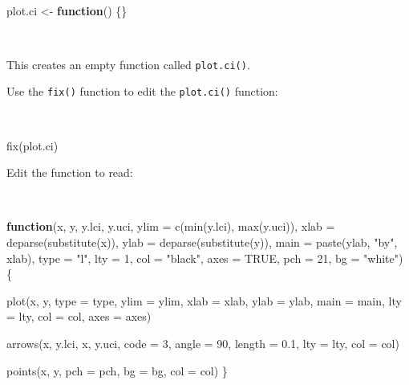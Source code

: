 \documentclass[
  12pt,
  a4paper]{book}
\newenvironment{Shaded}{\begin{snugshade}}{\end{snugshade}}
\newcommand{\AttributeTok}[1]{\textcolor[rgb]{0.77,0.63,0.00}{#1}}
\newcommand{\ConstantTok}[1]{\textcolor[rgb]{0.00,0.00,0.00}{#1}}
\newcommand{\ControlFlowTok}[1]{\textcolor[rgb]{0.13,0.29,0.53}{\textbf{#1}}}
\newcommand{\DecValTok}[1]{\textcolor[rgb]{0.00,0.00,0.81}{#1}}
\newcommand{\FloatTok}[1]{\textcolor[rgb]{0.00,0.00,0.81}{#1}}
\newcommand{\FunctionTok}[1]{\textcolor[rgb]{0.00,0.00,0.00}{#1}}
\newcommand{\NormalTok}[1]{#1}
\newcommand{\OtherTok}[1]{\textcolor[rgb]{0.56,0.35,0.01}{#1}}
\newcommand{\StringTok}[1]{\textcolor[rgb]{0.31,0.60,0.02}{#1}}
\begin{document}
~

\begin{Shaded}
\begin{Highlighting}[]
\NormalTok{plot.ci }\OtherTok{\textless{}{-}} \ControlFlowTok{function}\NormalTok{() \{\}}
\end{Highlighting}
\end{Shaded}

~

This creates an empty function called \texttt{plot.ci()}.

Use the \texttt{fix()} function to edit the \texttt{plot.ci()} function:

~

\begin{Shaded}
\begin{Highlighting}[]
\FunctionTok{fix}\NormalTok{(plot.ci)}
\end{Highlighting}
\end{Shaded}

\newpage

Edit the function to read:

~

\begin{Shaded}
\begin{Highlighting}[]
\ControlFlowTok{function}\NormalTok{(x,}
\NormalTok{         y, y.lci, y.uci,}
         \AttributeTok{ylim =} \FunctionTok{c}\NormalTok{(}\FunctionTok{min}\NormalTok{(y.lci), }\FunctionTok{max}\NormalTok{(y.uci)),}
         \AttributeTok{xlab =} \FunctionTok{deparse}\NormalTok{(}\FunctionTok{substitute}\NormalTok{(x)),}
         \AttributeTok{ylab =} \FunctionTok{deparse}\NormalTok{(}\FunctionTok{substitute}\NormalTok{(y)),}
         \AttributeTok{main =} \FunctionTok{paste}\NormalTok{(ylab, }\StringTok{"by"}\NormalTok{, xlab),}
         \AttributeTok{type =} \StringTok{"l"}\NormalTok{,}
         \AttributeTok{lty =} \DecValTok{1}\NormalTok{,}
         \AttributeTok{col =} \StringTok{"black"}\NormalTok{,}
         \AttributeTok{axes =} \ConstantTok{TRUE}\NormalTok{,}
         \AttributeTok{pch =} \DecValTok{21}\NormalTok{,}
         \AttributeTok{bg =} \StringTok{"white"}\NormalTok{) \{}

  \FunctionTok{plot}\NormalTok{(x, y, }\AttributeTok{type =}\NormalTok{ type, }\AttributeTok{ylim =}\NormalTok{ ylim, }\AttributeTok{xlab =}\NormalTok{ xlab, }\AttributeTok{ylab =}\NormalTok{ ylab,}
       \AttributeTok{main =}\NormalTok{ main, }\AttributeTok{lty =}\NormalTok{ lty, }\AttributeTok{col =}\NormalTok{ col, }\AttributeTok{axes =}\NormalTok{ axes)}
  
  \FunctionTok{arrows}\NormalTok{(x, y.lci, x, y.uci, }\AttributeTok{code =} \DecValTok{3}\NormalTok{, }\AttributeTok{angle =} \DecValTok{90}\NormalTok{, }\AttributeTok{length =} \FloatTok{0.1}\NormalTok{,}
         \AttributeTok{lty =}\NormalTok{ lty, }\AttributeTok{col =}\NormalTok{ col)}
  
  \FunctionTok{points}\NormalTok{(x, y, }\AttributeTok{pch =}\NormalTok{ pch, }\AttributeTok{bg =}\NormalTok{ bg, }\AttributeTok{col =}\NormalTok{ col)}
\NormalTok{\}}
\end{Highlighting}
\end{Shaded}
\end{document}
